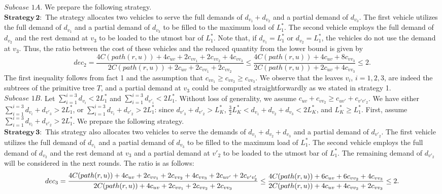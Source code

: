 \indent $Subcase \,\, 1A.$ We prepare the following strategy. \\
\indent $\mathbf{Strategy \, 2}:$ The strategy allocates two vehicles to serve the full demands of $d_{v_1}+d_{v_2}$ and a partial demand of $d_{v_3}$. The first vehicle utilizes the full demand of $d_{v_1}$ and a partial demand of $d_{v_3}$ to be filled to the maximum load of $L_1^*$. The second vehicle employs the full demand of $d_{v_2}$ and the rest demand at $v_3$ to be loaded to the utmost bar of $L_1^*$. Note that, if $d_{v_1}=L_1^*$ or $d_{v_2}=L_1^*$, the vehicles do not use the demand at $v_3$. Thus, the ratio between the cost of these vehicles and the reduced quantity from the lower bound is given by
$$dec_2=\frac{4C(path(r,u))+4c_{uv}+2c_{vv_1}+2c_{vv_2}+4c_{vv_3}}{2C(path(r,u))+2c_{uv}+2c_{vv_1}+2c_{vv_2}} \le \frac{4C(path(r,u))+4c_{uv}+8c_{vv_3}}{2C(path(r,u))+2c_{uv}+4c_{vv_3}} \le 2.$$
 \noindent The first inequality follows from fact 1 and the assumption that $c_{vv_1} \ge c_{vv_2} \ge c_{vv_3}$. We observe that the leaves $v_i$, $i=1,2,3$, are indeed the subtrees of the primitive tree $T$, and a partial demand at $v_3$ could be computed straightforwardly as we stated in strategy 1. \\

 \indent $Subcase \,\, 1B.$ Let $\sum_{i=1}^{i=3} d_{v_i} < 2L_1^*$ and $\sum_{i=1}^{i=3} d_{v'_i} < 2L_1^*$. Without loss of generality, we assume $c_{uv}+c_{vv_2} \ge c_{uv'}+c_{v'v'_2}$. We have either $\sum_{i=1}^{i=3} d_{v_i}+d_{v'_3} > 2L_1^*$, or $\sum_{i=1}^{i=3} d_{v_i}+d_{v'_2} > 2L_1^*$: since $d_{v'_3} +d_{v'_2} > L_K^*$, $\frac{3}{2} L_K^*< d_{v_1}+d_{v_2}+d_{v_3} < 2 L_K^*$, and $L_K^*\ge L_1^*$. First, assume $\sum_{i=1}^{i=3} d_{v_i}+d_{v'_2} > 2L_1^*$. We prepare the following strategy. \\
 
\indent $\mathbf{Strategy \, 3}:$ This strategy also allocates two vehicles to serve the demands of $d_{v_1}+d_{v_2}+ d_{v_3}$ and a partial demand of $d_{v'_2}$. The first vehicle utilizes the full demand of $d_{v_1}$ and a partial demand of $d_{v_3}$ to be filled to the maximum load of $L_1^*$. The second vehicle employs the full demand of $d_{v_2}$ and the rest demand at $v_3$ and a partial demand at $v'_2$ to be loaded to the utmost bar of $L_1^*$. The remaining demand of $d_{v'_2}$ will be considered in the next rounds. The ratio is as follows:
$$dec_3=\frac{4C(path(r,u))+4c_{uv}+2c_{vv_1}+2c_{vv_2}+4c_{vv_3}+2c_{uv'}+2c_{v'v'_2}}{2C(path(r,u))+4c_{uv}+2c_{vv_1}+2c_{vv_2}+2c_{vv_3}}\\
\le \frac{4C(path(r,u))+6c_{uv}+6c_{vv_2}+4c_{vv_3}}{2C(path(r,u))+4c_{uv}+4c_{vv_2}+2c_{vv_3}}\le 2.$$

